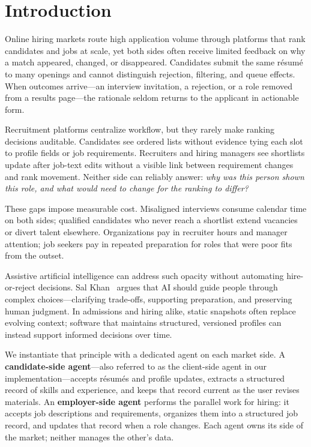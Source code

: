 \section{Introduction}\label{sec:1}

Online hiring markets route high application volume through platforms that rank candidates and jobs at scale, yet both sides often receive limited feedback on why a match appeared, changed, or disappeared.
Candidates submit the same résumé to many openings and cannot distinguish rejection, filtering, and queue effects.
When outcomes arrive---an interview invitation, a rejection, or a role removed from a results page---the rationale seldom returns to the applicant in actionable form.

Recruitment platforms centralize workflow, but they rarely make ranking decisions auditable.
Candidates see ordered lists without evidence tying each slot to profile fields or job requirements.
Recruiters and hiring managers see shortlists update after job-text edits without a visible link between requirement changes and rank movement.
Neither side can reliably answer: \emph{why was this person shown this role, and what would need to change for the ranking to differ?}

These gaps impose measurable cost.
Misaligned interviews consume calendar time on both sides; qualified candidates who never reach a shortlist extend vacancies or divert talent elsewhere.
Organizations pay in recruiter hours and manager attention; job seekers pay in repeated preparation for roles that were poor fits from the outset.

Assistive artificial intelligence can address such opacity without automating hire-or-reject decisions.
Sal Khan~\cite{Khan2024} argues that AI should guide people through complex choices---clarifying trade-offs, supporting preparation, and preserving human judgment.
In admissions and hiring alike, static snapshots often replace evolving context; software that maintains structured, versioned profiles can instead support informed decisions over time.

We instantiate that principle with a dedicated agent on each market side.
A \textbf{candidate-side agent}---also referred to as the client-side agent in our implementation---accepts résumés and profile updates, extracts a structured record of skills and experience, and keeps that record current as the user revises materials.
An \textbf{employer-side agent} performs the parallel work for hiring: it accepts job descriptions and requirements, organizes them into a structured job record, and updates that record when a role changes.
Each agent owns its side of the market; neither manages the other's data.

